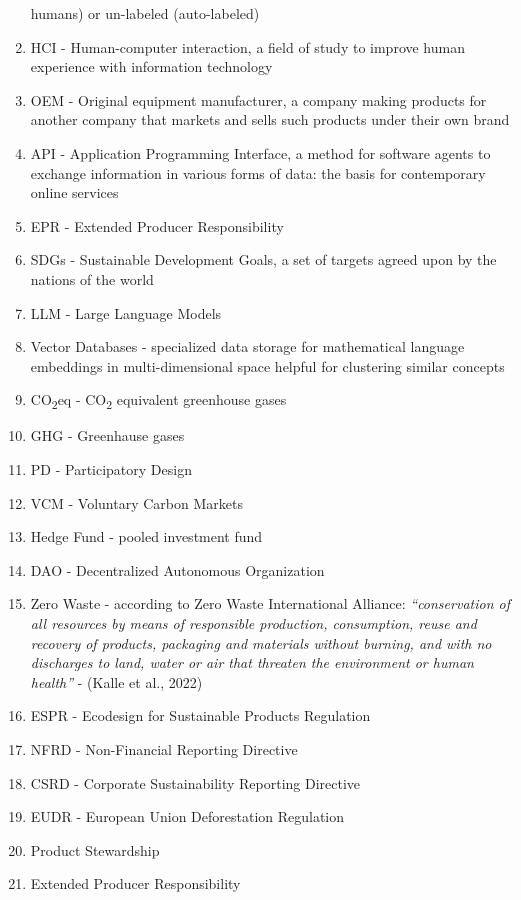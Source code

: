 \documentclass[
  12pt,
  letterpaper,
  DIV=11,
  numbers=noendperiod]{scrartcl}
\begin{document}
\begin{enumerate}
  humans) or un-labeled (auto-labeled)
\item
  HCI - Human-computer interaction, a field of study to improve human
  experience with information technology
\item
  OEM - Original equipment manufacturer, a company making products for
  another company that markets and sells such products under their own
  brand
\item
  API - Application Programming Interface, a method for software agents
  to exchange information in various forms of data: the basis for
  contemporary online services
\item
  EPR - Extended Producer Responsibility
\item
  SDGs - Sustainable Development Goals, a set of targets agreed upon by
  the nations of the world
\item
  LLM - Large Language Models
\item
  Vector Databases - specialized data storage for mathematical language
  embeddings in multi-dimensional space helpful for clustering similar
  concepts
\item
  CO\textsubscript{2}eq - CO\textsubscript{2} equivalent greenhouse
  gases
\item
  GHG - Greenhause gases
\item
  PD - Participatory Design
\item
  VCM - Voluntary Carbon Markets
\item
  Hedge Fund - pooled investment fund
\item
  DAO - Decentralized Autonomous Organization
\item
  Zero Waste - according to Zero Waste International Alliance:
  \emph{``conservation of all resources by means of responsible
  production, consumption, reuse and recovery of products, packaging and
  materials without burning, and with no discharges to land, water or
  air that threaten the environment or human health''} - (Kalle et al.,
  2022)
\item
  ESPR - Ecodesign for Sustainable Products Regulation
\item
  NFRD - Non-Financial Reporting Directive
\item
  CSRD - Corporate Sustainability Reporting Directive
\item
  EUDR - European Union Deforestation Regulation
\item
  Product Stewardship
\item
  Extended Producer Responsibility
\end{enumerate}
\end{document}
